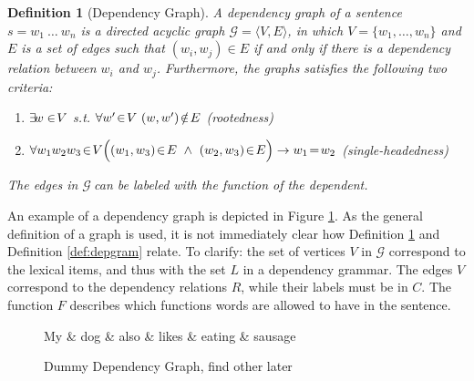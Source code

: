 \documentclass{report}
\theoremstyle{break}
\newtheorem{definition}{Definition}
\begin{document}
\begin{definition}[Dependency Graph]\label{def:depgraph}
A dependency graph of a sentence $s = w_1~\ldots~w_n$ is a directed acyclic graph $\mathcal{G} = \langle V, E\rangle$, in which $V = \{w_1, \ldots,w_n\}$ and $E$ is a set of edges such that $(w_i,w_j)\in E$ if and only if there is a dependency relation between $w_i$ and $w_j$. Furthermore, the graphs satisfies the following two criteria:
\begin{enumerate}
\item $\exists\negthinspace w\in\negthinspace V$ s.t. $\forall w'\negthinspace\in\negthinspace V~(w,w')\negthinspace\notin\negthinspace E$ \hfill (rootedness)
\item $\forall w_1 w_2 w_3\negthinspace \in\negthinspace V\Big( (w_1,w_3)\negthinspace\in\negthinspace E~\land~(w_2,w_3)\negthinspace \in\negthinspace E\Big) \rightarrow w_1\negthinspace=\negthinspace w_2$ \hfill (single-headedness)
\end{enumerate}
The edges in $\mathcal{G}~$can be labeled with the function of the dependent.
\end{definition}

\noindent An example of a dependency graph is depicted in Figure \ref{fig:depgraph}. As the general definition of a graph is used, it is not immediately clear how  Definition \ref{def:depgraph} and Definition \ref{def:depgram} relate. To clarify: the set of vertices $V$ in $\mathcal{G}$ correspond to the lexical items, and thus with the set $L$ in a dependency grammar. The edges $V$ correspond to the dependency relations $R$, while their labels must be in $C$. The function $F$ describes which functions words are allowed to have in the sentence. 

\begin{figure}[!ht]
\centering
\begin{dependency}[theme=simple]%
\begin{deptext}[column sep=.5cm, row sep=.1ex]
My \& dog \& also \& likes \& eating \& sausage \\
\end{deptext}
\end{dependency}
\caption{Dummy Dependency Graph, find other later}\label{fig:depgraph}
\end{figure}
\end{document}
